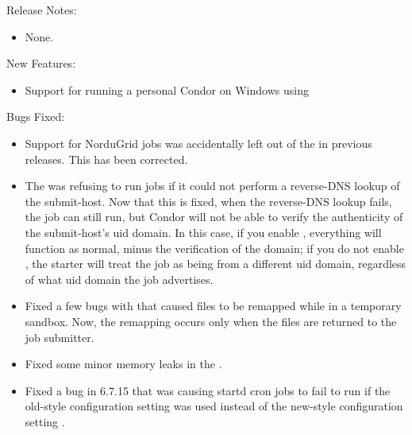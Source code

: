 \noindent Release Notes:

\begin{itemize}

\item None.

\end{itemize}


\noindent New Features:

\begin{itemize}

\item Support for running a personal Condor on Windows using
 

\end{itemize}

\noindent Bugs Fixed:

\begin{itemize}

\item Support for NorduGrid jobs was accidentally left out of the
 in previous releases. This has been corrected.

\item The  was refusing to run jobs if it could not
perform a reverse-DNS lookup of the submit-host.  Now that this is
fixed, when the reverse-DNS lookup fails, the job can still run, but
Condor will not be able to verify the authenticity of the
submit-host's uid domain.  In this case, if you enable
, everything will function as normal, minus
the verification of the domain; if you do not enable
, the starter will treat the job as being
from a different uid domain, regardless of what uid domain the job
advertises.

\item Fixed a few bugs with  that caused
files to be remapped while in a temporary sandbox. Now, the remapping
occurs only when the files are returned to the job submitter.

\item Fixed some minor memory leaks in the .

\item Fixed a bug in 6.7.15 that was causing startd cron jobs to fail to run
if the old-style configuration setting  was used
instead of the new-style configuration setting .

\end{itemize}

